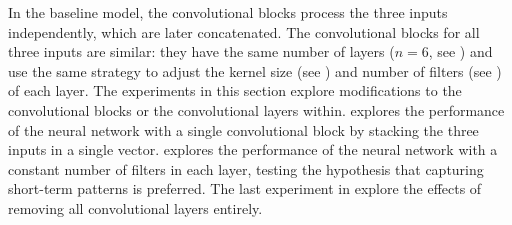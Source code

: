 
In the baseline model, the convolutional blocks process the
three inputs independently, which are later concatenated.
The convolutional blocks for all three inputs are similar:
they have the same number of layers ($n=6$, see
) and use the
same strategy to adjust the kernel size (see
) and number of filters (see
) of each layer. The
experiments in this section explore modifications to the
convolutional blocks or the convolutional layers within.
 explores the
performance of the neural network with a single
convolutional block by stacking the three inputs in a single
vector.  explores the
performance of the neural network with a constant number of
filters in each layer, testing the hypothesis that capturing
short-term patterns is preferred. The last experiment in
 explore the effects of
removing all convolutional layers entirely.
